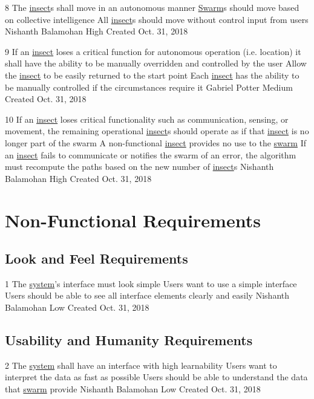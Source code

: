 \documentclass[11pt]{article}
\begin{document}
\functionalRequirement
{8}
{The \hyperref[sec:definitions]{insect}s shall move in an autonomous manner}
{\hyperref[sec:definitions]{Swarm}s should move based on collective intelligence}
{All \hyperref[sec:definitions]{insect}s should move without control input from users}
{Nishanth Balamohan}
{High}
{Created Oct. 31, 2018}

\functionalRequirement
{9}
{If an \hyperref[sec:definitions]{insect} loses a critical function for autonomous operation (i.e. location) it shall have the ability to be manually overridden and controlled by the user}
{Allow the \hyperref[sec:definitions]{insect} to be easily returned to the start point}
{Each \hyperref[sec:definitions]{insect} has the ability to be manually controlled if the circumstances require it}
{Gabriel Potter}
{Medium}
{Created Oct. 31, 2018}

\functionalRequirement
{10}
{If an \hyperref[sec:definitions]{insect} loses critical functionality such as communication, sensing, or movement, the remaining operational \hyperref[sec:definitions]{insect}s should operate as if that \hyperref[sec:definitions]{insect} is no longer part of the swarm}
{A non-functional \hyperref[sec:definitions]{insect} provides no use to the \hyperref[sec:definitions]{swarm}}
{If an \hyperref[sec:definitions]{insect} fails to communicate or notifies the swarm of an error, the algorithm must recompute the paths based on the new number of \hyperref[sec:definitions]{insect}s}
{Nishanth Balamohan}
{High}
{Created Oct. 31, 2018}

\section{Non-Functional Requirements}

\subsection{Look and Feel Requirements}
\nonFunctionalRequirement
{1}
{The \hyperref[sec:definitions]{system}'s interface must look simple}
{Users want to use a simple interface}
{Users should be able to see all interface elements clearly and easily}
{Nishanth Balamohan}
{Low}
{Created Oct. 31, 2018}

\subsection{Usability and Humanity Requirements}

\nonFunctionalRequirement
{2}
{The \hyperref[sec:definitions]{system} shall have an interface with high learnability}
{Users want to interpret the data as fast as possible}
{Users should be able to understand the data that \hyperref[sec:definitions]{swarm} provide}
{Nishanth Balamohan}
{Low}
{Created Oct. 31, 2018}
\end{document}
